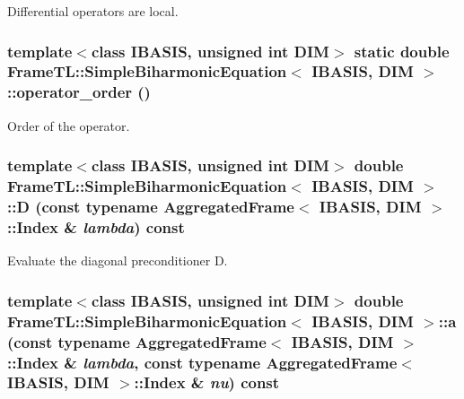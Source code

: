 Differential operators are local. \hypertarget{classFrameTL_1_1SimpleBiharmonicEquation_f0bb15f82dc56ef8739a37af36d52cb0}{
\subsubsection[operator\_\-order]{\setlength{\rightskip}{0pt plus 5cm}template$<$class IBASIS, unsigned int DIM$>$ static double {\bf FrameTL::SimpleBiharmonicEquation}$<$ IBASIS, DIM $>$::operator\_\-order ()}}
\label{classFrameTL_1_1SimpleBiharmonicEquation_f0bb15f82dc56ef8739a37af36d52cb0}


Order of the operator. \hypertarget{classFrameTL_1_1SimpleBiharmonicEquation_0b1b68d78e17e9686b8feb3b899b572f}{
\subsubsection[D]{\setlength{\rightskip}{0pt plus 5cm}template$<$class IBASIS, unsigned int DIM$>$ double {\bf FrameTL::SimpleBiharmonicEquation}$<$ IBASIS, DIM $>$::D (const typename {\bf AggregatedFrame}$<$ IBASIS, DIM $>$::{\bf Index} \& {\em lambda}) const}}
\label{classFrameTL_1_1SimpleBiharmonicEquation_0b1b68d78e17e9686b8feb3b899b572f}


Evaluate the diagonal preconditioner D. \hypertarget{classFrameTL_1_1SimpleBiharmonicEquation_736592304b02f99e4a44068508072d89}{
\subsubsection[a]{\setlength{\rightskip}{0pt plus 5cm}template$<$class IBASIS, unsigned int DIM$>$ double {\bf FrameTL::SimpleBiharmonicEquation}$<$ IBASIS, DIM $>$::a (const typename {\bf AggregatedFrame}$<$ IBASIS, DIM $>$::{\bf Index} \& {\em lambda}, \/  const typename {\bf AggregatedFrame}$<$ IBASIS, DIM $>$::{\bf Index} \& {\em nu}) const}}
\label{classFrameTL_1_1SimpleBiharmonicEquation_736592304b02f99e4a44068508072d89}


